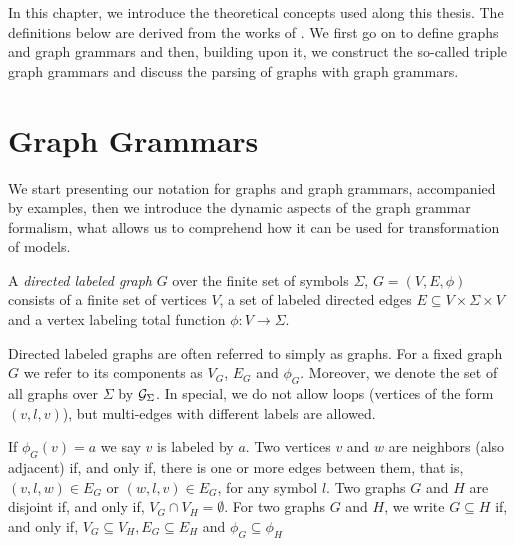 
In this chapter, we introduce the theoretical concepts used along this thesis. The definitions below are derived from the works of \citep{rozenberg1986boundary, janssens1982graph,kim2001efficient}.
We first go on to define graphs and graph grammars and then, building upon it, we construct the so-called triple graph grammars and discuss the parsing of graphs with graph grammars.

\section{Graph Grammars}
We start presenting our notation for graphs and graph grammars, accompanied by examples, then we introduce the dynamic aspects of the graph grammar formalism, what allows us to comprehend how it can be used for transformation of models.

\begin{definition}
	\label{def:graph}
	A \emph{directed labeled graph} $G$ over the finite set of symbols $\Sigma$, $G = (V, E, \phi)$ consists of a finite set of vertices $V$, a set of labeled directed edges $E \subseteq V \times \Sigma \times V$ and a vertex labeling total function $\phi : V \to \Sigma$.
\end{definition}

Directed labeled graphs are often referred to simply as graphs. For a fixed graph $G$ we refer to its components as $V_G$, $E_G$ and $\phi_G$. Moreover, we denote the set of all graphs over $\Sigma$ by $\mathcal{G}_{\Sigma}$. In special, we do not allow loops (vertices of the form $(v,l,v)$), but multi-edges with different labels are allowed.

If $\phi_G(v) = a$ we say $v$ is labeled by $a$. Two vertices $v$ and $w$ are neighbors (also adjacent) if, and only if, there is one or more edges between them, that is, $(v,l,w) \in E_G$ or $(w,l,v) \in E_G$, for any symbol $l$. Two graphs $G$ and $H$ are disjoint if, and only if, $V_G \cap V_H = \emptyset$. For two graphs $G$ and $H$, we write $G \subseteq H$ if, and only if, $V_G \subseteq V_H, E_G \subseteq E_H$ and $\phi_G \subseteq \phi_H$

